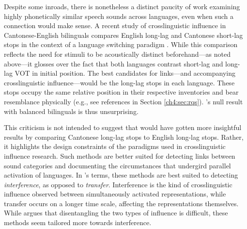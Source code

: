 Despite some inroads, there is nonetheless a distinct paucity of work examining highly phonetically similar speech sounds across languages, even when such a connection would make sense. A recent study of crosslinguistic influence in Cantonese-English bilinguals compares English long-lag and Cantonese short-lag stops in the context of a language switching paradigm \citep{tsui_2019_switching}. While this comparison reflects the need for stimuli to be acoustically distinct beforehand---as noted above---it glosses over the fact that both languages contrast short-lag and long-lag VOT in initial position. The best candidates for links---and accompanying crosslinguistic influence---would be the long-lag stops in each language. These stops occupy the same relative position in their respective inventories and bear resemblance physically (e.g., see references in Section \ref{ch4:sec:rqs}). \citeauthor{tsui_2019_switching}'s \citeyearpar{tsui_2019_switching} null result with balanced bilinguals is thus unsurprising. 

This criticism is not intended to suggest that \citep{tsui_2019_switching} would have gotten more insightful results by comparing Cantonese long-lag stops to English long-lag stops. Rather, it highlights the design constraints of the paradigms used in crosslinguistic influence research. Such methods are better suited for detecting links between sound categories and documenting the circumstances that undergird parallel activation of languages. In \citeauthor{grosjean_2011_transfer}'s \citeyearpar{grosjean_2011_transfer} terms, these methods are best suited to detecting \textit{interference}, as opposed to \textit{transfer}. Interference is the kind of crosslinguistic influence observed between simultaneously activated representations, while transfer occurs on a longer time scale, affecting the representations themselves. While \citet{grosjean_2011_transfer} argues that disentangling the two types of influence is difficult, these methods seem tailored more towards interference. 


